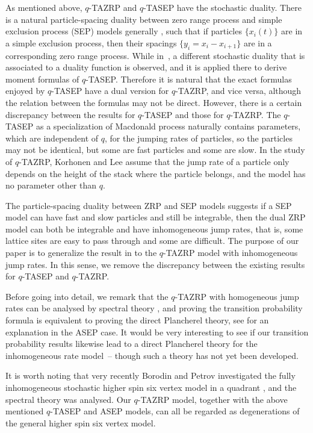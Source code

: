 \documentclass[pdftex]{sigma}
\numberwithin{equation}{section}
\begin{document}
As mentioned above, $q$-TAZRP and $q$-TASEP have the stochastic duality. There is a natural particle-spacing duality between zero range process and simple exclusion process (SEP) models generally \cite{Spitzer70}, such that if particles $\{ x_i(t) \}$ are in a simple exclusion process, then their spacings $\{ y_i = x_i - x_{i + 1} \}$ are in a corresponding zero range process. While in~\cite{Borodin-Corwin-Sasamoto14}, a dif\/ferent stochastic duality that is associated to a duality function is observed, and it is applied there to derive moment formulas of $q$-TASEP. Therefore it is natural that the exact formulas enjoyed by $q$-TASEP have a dual version for $q$-TAZRP, and vice versa, although the relation between the formulas may not be direct. However, there is a certain discrepancy between the results for $q$-TASEP and those for $q$-TAZRP. The $q$-TASEP as a specialization of Macdonald process naturally contains parameters, which are independent of $q$, for the jumping rates of particles, so the particles may not be identical, but some are fast particles and some are slow. In the study of $q$-TAZRP, Korhonen and Lee assume that the jump rate of a particle only depends on the height of the stack where the particle belongs, and the model has no parameter other than $q$.

The particle-spacing duality between ZRP and SEP models suggests if a SEP model can have fast and slow particles and still be integrable, then the dual ZRP model can both be integrable and have inhomogeneous jump rates, that is, some lattice sites are easy to pass through and some are dif\/f\/icult. The purpose of our paper is to generalize the result in \cite{Korhonen-Lee14} to the $q$-TAZRP model with inhomogeneous jump rates. In this sense, we remove the discrepancy between the existing results for $q$-TASEP and $q$-TAZRP.

Before going into detail, we remark that the $q$-TAZRP with homogeneous jump rates can be analysed by spectral theory \cite{Borodin-Corwin-Petrov-Sasamoto15}, and proving the transition probability formula is equivalent to proving the direct Plancherel theory, see \cite[Section 7.5]{Borodin-Corwin-Petrov-Sasamoto15a} for an explanation in the ASEP case.
It would be very interesting to see if our transition probability results likewise lead to a direct Plancherel theory for the inhomogeneous rate model~-- though such a theory has not yet been developed.

It is worth noting that very recently Borodin and Petrov investigated the fully inhomogeneous stochastic higher spin six vertex model in a quadrant \cite{Borodin-Petrov16}, and the spectral theory was analysed. Our $q$-TAZRP model, together with the above mentioned $q$-TASEP and ASEP models, can all be regarded as degenerations of the general higher spin six vertex model.
\end{document}
